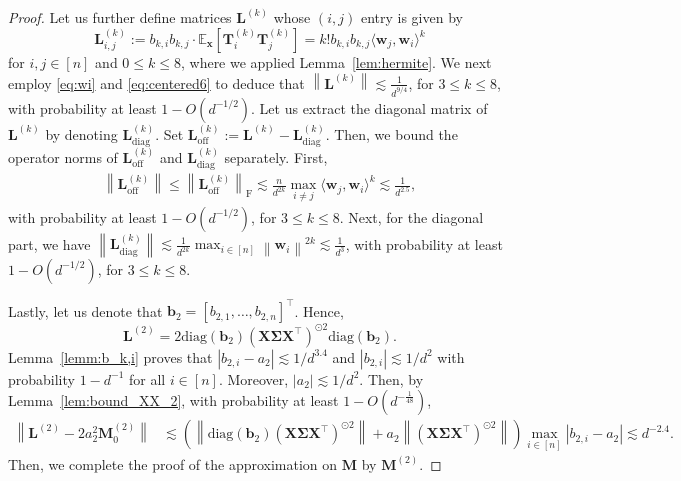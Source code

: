 \documentclass[twoside,11pt]{article}
\newcommand{\norm}[1]{\left\|#1\right\|}
\newcommand{\bw}{\boldsymbol{w}}
\newcommand{\E}{\mathbb{E}}
\newcommand{\diag}{\text{diag}}
\def\bX{{\boldsymbol X}}
\def\bM{{\boldsymbol M}}
\def\bb{{\boldsymbol b}}
\def\bw{{\boldsymbol w}}
\def\bx{{\boldsymbol x}}
\def\bSigma{{\boldsymbol \Sigma}}
\def\T{{\mathbb T}}
\def\T{{\mathbb T}}
\renewcommand{\T}{\boldsymbol{T}}
\renewcommand{\L}{\boldsymbol{L}}
\newcommand{\1}{\mathbf{1}}
\begin{document}
\begin{proof}
 Let us further define matrices $\L^{(k)}$ whose $(i,j)$ entry is given  by
\[\L^{(k)}_{i,j}:=b_{k,i}b_{k,j}\cdot \E_{\bx}[\T_i^{(k)}\T_j^{(k)}]=k!b_{k,i}b_{k,j}\langle \bw_j,\bw_i\rangle^k\] for $i,j\in[n]$ and $0\le k\le 8$, where we applied Lemma~\ref{lem:hermite}. 
We next employ \eqref{eq:wi} and \eqref{eq:centered6} to deduce that
$\norm{\L^{(k)}} \lesssim  \frac{1 }{d^{9/4}}$,
for $3\le k\le 8$, with probability at least $1-O(d^{-1/2})$. 
Let us extract the diagonal matrix of  $\L^{(k)}$ by denoting $\L^{(k)}_{\text{diag}}$. Set $\L^{(k)}_{\text{off}}:=\L^{(k)}-\L^{(k)}_{\text{diag}}$. Then, we bound the operator norms of $\L^{(k)}_{\text{off}}$ and $\L^{(k)}_{\text{diag}}$ separately. First, 
\begin{align}
    \norm{\L^{(k)}_{\text{off}}}\le \norm{\L^{(k)}_{\text{off}}}_{\mathrm{F}}\lesssim \frac{n}{d^{2k}}\max_{i\neq j}\langle \bw_j,\bw_i\rangle^k\lesssim \frac{1}{d^{2.5}},
\end{align}
with probability at least $1-O(d^{-1/2})$, for $3\le k\le 8$. Next, for the diagonal part, we have
$ \norm{\L^{(k)}_{\text{diag}}}\lesssim \frac{1}{d^{2k}}\max_{i\in [n]}\norm{\bw_i}^{2k}\lesssim \frac{1}{d^{3}}$,
with probability at least $1-O(d^{-1/2})$, for $3\le k\le 8$. 

Lastly, let us denote that $\bb_2=[b_{2,1},\ldots,b_{2,n}]^\top$. Hence, $$\L^{(2)}=2\diag(\bb_2)(\bX\bSigma\bX^\top)^{\odot 2}\diag(\bb_2).$$ Lemma~\ref{lemm:b_k,i} proves that $|b_{2,i}-a_2|\lesssim 1/d^{3.4}$ and $|b_{2,i}|\lesssim 1/d^2$ with probability  $1-d^{-1}$ for all $i\in[n]$. Moreover, $|a_{2}|\lesssim 1/d^2$. Then, by Lemma~\ref{lem:bound_XX_2},   with probability at least $1-O(d^{-\frac{1}{48}})$,
\begin{align}
    \norm{\L^{(2)}-2a^2_2\bM_0^{(2)}}&\lesssim \left(\norm{\diag(\bb_2)(\bX\bSigma\bX^\top)^{\odot 2}}+a_2\norm{ (\bX\bSigma\bX^\top)^{\odot 2}}\right)\max_{i\in [n]}|b_{2,i}-a_2|\lesssim d^{-{2.4}}.
\end{align}
Then, we complete the proof of the approximation on $\bM$ by $\bM^{(2)}$. 
\end{proof}
\end{document}
